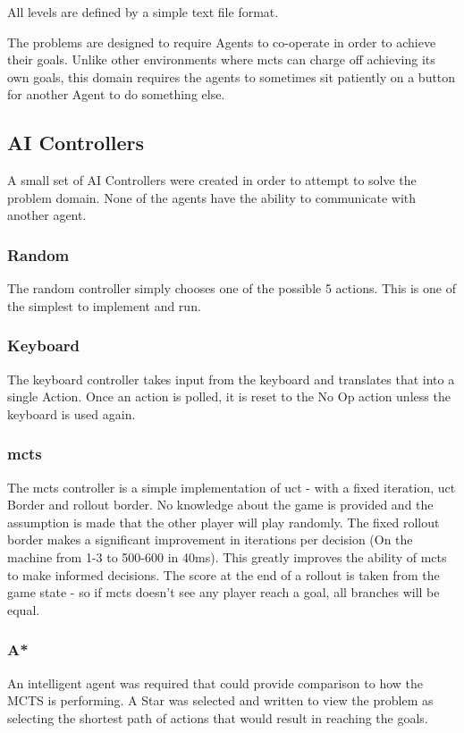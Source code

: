 \documentclass{IEEEtran}
\begin{document}
All levels are defined by a simple text file format.

The problems are designed to require Agents to co-operate in order to achieve their goals. Unlike other environments where \gls{mcts} can charge off achieving its own goals, this domain requires the agents to sometimes sit patiently on a button for another Agent to do something else.


\subsection{AI Controllers}
A small set of AI Controllers were created in order to attempt to solve the problem domain. None of the agents have the ability to communicate with another agent.
\subsubsection{Random}
The random controller simply chooses one of the possible 5 actions. This is one of the simplest to implement and run.
\subsubsection{Keyboard}
The keyboard controller takes input from the keyboard and translates that into a single Action. Once an action is polled, it is reset to the No Op action unless the keyboard is used again. 
\subsubsection{\gls{mcts}}
The \gls{mcts} controller is a simple implementation of \gls{uct} - with a fixed iteration, \gls{uct} Border and rollout border. No knowledge about the game is provided and the assumption is made that the other player will play randomly. The fixed rollout border makes a significant improvement in iterations per decision (On the machine from 1-3 to 500-600 in 40ms). This greatly improves the ability of \gls{mcts} to make informed decisions. The score at the end of a rollout is taken from the game state - so if \gls{mcts} doesn't see any player reach a goal, all branches will be equal.
\subsubsection{A*}
An intelligent agent was required that could provide comparison to how the MCTS is performing. A Star was selected and written to view the problem as selecting the shortest path of actions that would result in reaching the goals.
\end{document}
